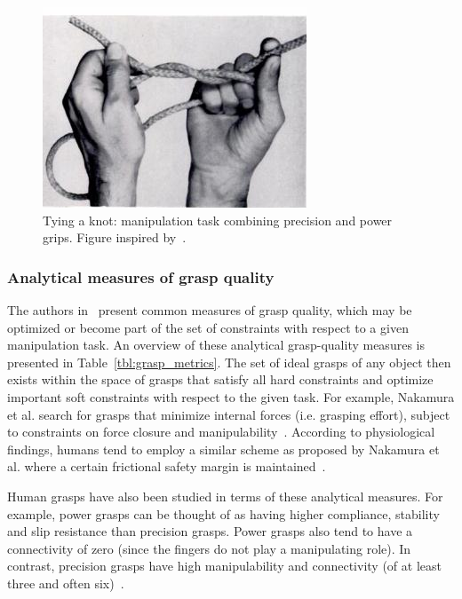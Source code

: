 \begin{figure}[]
	\centering
	\includegraphics[width=\linewidth]{images/tie_rope}
	\caption{Tying a knot: manipulation task combining precision and power grips. Figure inspired by~\cite{napier1956prehensile}.}
	\label{fig:tie_rope}
\end{figure}


\subsubsection*{Analytical measures of grasp quality}
The authors in~\cite{cutkosky1990human} present common measures of grasp quality, which may be optimized or become part of the set of constraints with respect to a given manipulation task.
An overview of these analytical grasp-quality measures is presented in Table~\ref{tbl:grasp_metrics}.
The set of ideal grasps of any object then exists within the space of grasps that satisfy all hard constraints and optimize important soft constraints with respect to the given task.
For example, Nakamura et al. search for grasps that minimize internal forces (i.e. grasping effort), subject to constraints on force closure and manipulability~\cite{nakamura1987mechanics}.
According to physiological findings, humans tend to employ a similar scheme as proposed by Nakamura et al. where a certain frictional safety margin is maintained~\cite{ring1968paper}.

Human grasps have also been studied in terms of these analytical measures.
For example, power grasps can be thought of as having higher compliance, stability and slip resistance than precision grasps.
Power grasps also tend to have a connectivity of zero (since the fingers do not play a manipulating role).
In contrast, precision grasps have high manipulability and connectivity (of at least three and often six)~\cite{cutkosky1990human}.

